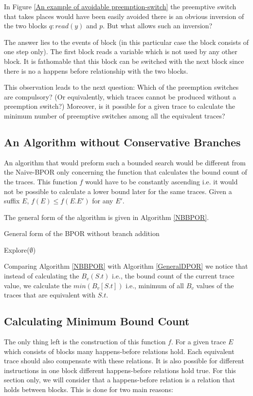 In Figure \ref{An example of avoidable preemption-switch} the preemptive switch that takes places would have been easily
avoided there is an obvious inversion of the two blocks $q:read(y)$ and $p$. But what allows such an inversion?

The answer lies to the events of block (in this particular case the block consists of one step only). The first block
reads a variable which is not used by any other block. It is fathomable that this block can be switched with the next
block since there is no a happens before relationship with the two blocks.

This observation leads to the next question: Which of the preemption switches are compulsory? (Or equivalently, which
traces cannot be produced without a preemption switch?) Moreover, is it possible for a given trace to calculate the
minimum number of preemptive switches among all the equivalent traces?

\subsection{An Algorithm without Conservative Branches}
An algorithm that would preform such a bounded search would be different from the Naive-BPOR only concerning the
function that calculates the bound count of the traces. This function $f$ would have to be constantly ascending i.e. it
would not be possible to calculate a lower bound later for the same traces. Given a suffix $E$, $f(E) \leq f(E.E')$ for
any $E'$.

The general form of the algorithm is given in Algorithm \ref{NBBPOR}.

\begin{algorithm}[H]
    \SetAlgoLined
    \caption{General form of the BPOR without branch addition}
    \label{NBBPOR}
    Explore($\emptyset$)\;
\end{algorithm}

Comparing Algorithm \ref{NBBPOR} with Algorithm \ref{GeneralDPOR} we notice that instead of calculating the $B_v(S.t)$ i.e., the
bound count of the current trace value, we calculate the $min(B_v[S.t])$ i.e., minimum of all $B_v$ values of the traces
that are equivalent with $S.t$.

\subsection{Calculating Minimum Bound Count}
The only thing left is the construction of this function $f$. For a given trace $E$ which consists of blocks many
happens-before relations hold. Each equivalent trace should also compensate with these relations. It is also possible
for different instructions in one block different happens-before relations hold true. For this section only, we will
consider that a happens-before relation is a relation that holds between blocks. This is done for two main reasons:

